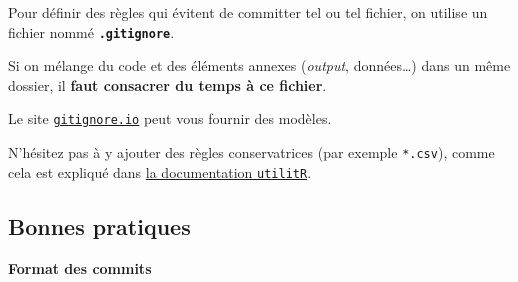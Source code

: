 \documentclass[
  letterpaper,
  DIV=11,
  numbers=noendperiod]{scrartcl}
\begin{document}
\begin{tcolorbox}[enhanced jigsaw, colframe=quarto-callout-note-color-frame, rightrule=.15mm, breakable, colbacktitle=quarto-callout-note-color!10!white, coltitle=black, toptitle=1mm, title=\textcolor{quarto-callout-note-color}{\faInfo}\hspace{0.5em}{Note}, titlerule=0mm, leftrule=.75mm, colback=white, bottomrule=.15mm, bottomtitle=1mm, toprule=.15mm, opacitybacktitle=0.6, arc=.35mm, left=2mm, opacityback=0]

Pour définir des règles qui évitent de committer tel ou tel fichier, on
utilise un fichier nommé \textbf{\texttt{.gitignore}}.

Si on mélange du code et des éléments annexes (\emph{output},
données\ldots) dans un même dossier, il {\textbf{faut consacrer du temps
à ce fichier}}.

Le site
\href{https://www.toptal.com/developers/gitignore}{\texttt{gitignore.io}}
peut vous fournir des modèles.

N'hésitez pas à y ajouter des règles conservatrices (par exemple
\texttt{*.csv}), comme cela est expliqué dans
\href{https://www.book.utilitr.org/git.html?q=gitignore\#gitignore}{la
documentation \texttt{utilitR}}.

\end{tcolorbox}

\hypertarget{bonnes-pratiques-1}{%
\subsection{Bonnes pratiques}\label{bonnes-pratiques-1}}

\textbf{Format des commits}
\end{document}
